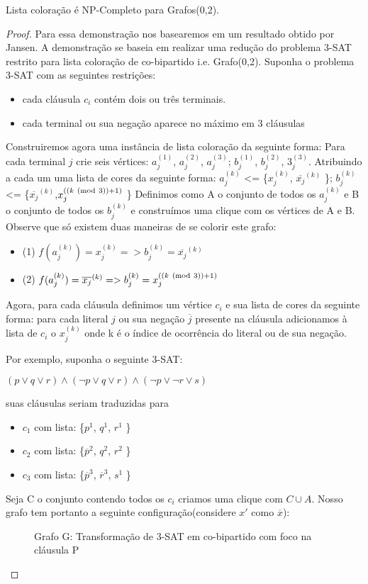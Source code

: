 \begin{teorema}
  \label{teorema:lista-2}
	Lista coloração é NP-Completo para Grafos(0,2).
	\begin{proof}
		Para essa demonstração nos basearemos em um resultado obtido por Jansen\cite{jansen1999}. A demonstração se baseia em realizar uma redução do problema 3-SAT restrito para lista coloração de co-bipartido i.e. Grafo(0,2).
		Suponha o problema 3-SAT com as seguintes restrições:
		\begin{itemize}
			\item cada cláusula $c_i$ contém dois ou três terminais.
			\item cada terminal ou sua negação aparece no máximo em 3 cláusulas
		\end{itemize}
		Construiremos agora uma instância de lista coloração da seguinte forma:\newline
		Para cada terminal $j$ crie seis vértices:
		$a_j^{(1)}$, $a_j^{(2)}$, $a_j^{(3)}$;
		$b_j^{(1)}$, $b_j^{(2)}$, $3_j^{(3)}$. Atribuindo a cada um uma lista de cores da seguinte forma:\newline
		$a_j^{(k)}$ <= \{$x_j^{(k)}$, $\overline{x_j}^{(k)}$ \}; $b_j^{(k)}$ <= \{$\overline{x_j}^{(k)}$,$x_j^{((k \ (\mathrm{mod}\ 3)) + 1 )}$ \}\newline
		Definimos como A o conjunto de todos os $a_j^{(k)}$ e B o conjunto de todos os $b_j^{(k)}$ e construímos uma clique com os vértices de A e B. Observe que só existem duas maneiras de se colorir este grafo:
		\begin{itemize}
			\item (1)  $f(a_j^{(k)}) = x_j^{(k)} => b_j^{(k)} = \overline{x_j}^{(k)}$
			\item (2)  $f(a_j^{(k)}) = \overline{x_j}^{(k)} => b_j^{(k)} = x_j^{((k \ (\mathrm{mod}\ 3)) + 1 )}$
		\end{itemize}
		Agora, para cada cláusula definimos um vértice $c_i$ e sua lista de cores da seguinte forma: para cada literal $j$ ou sua negação $\overline{j}$ presente na cláusula adicionamos à lista de $c_i$ o $x_j^{(k)}$ onde k é o índice de ocorrência do literal ou de sua negação.
		
		Por exemplo, suponha o seguinte 3-SAT:
		
		$(p \lor q \lor r) \land (\neg{p} \lor q \lor r) \land (\neg{p} \lor \neg{r} \lor s)$
		
		suas cláusulas seriam traduzidas para
		\begin{itemize}
			\item $c_1$ com lista: \{$p^1$, $q^1$, $r^1$ \}
			\item $c_2$ com lista: \{$\overline{p}^2$, $q^2$, $r^2$ \}
			\item $c_3$ com lista: \{$\overline{p}^3$, $\overline{r}^3$, $s^1$ \}
		\end{itemize}
		Seja C o conjunto contendo todos os $c_i$ criamos uma clique com $C \cup A$.
		Nosso grafo tem portanto a seguinte configuração(considere $x'$ como $\overline{x}$):
		\begin{figure}[!ht]
			\centering
			
			\caption{Grafo G: Transformação de 3-SAT em co-bipartido com foco na cláusula P }
		\end{figure}
		

\end{proof}
\end{teorema}
